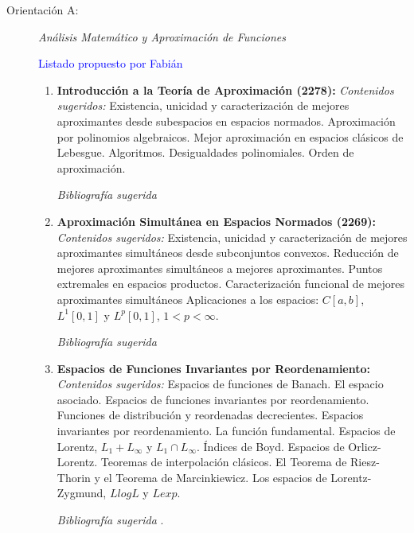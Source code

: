 \documentclass[a4paper, 12pt]{article}
\begin{document}
\begin{description}

\item[Orientación A:] \emph{Análisis Matemático y Aproximación de Funciones}

\textcolor{blue}{Listado propuesto por Fabián}


\begin{enumerate}


\item\textbf{Introducción a la Teoría de Aproximación (2278):}
\emph{Contenidos sugeridos:}
Existencia, unicidad y caracterización de mejores aproximantes desde subespacios en espacios normados. Aproximación por polinomios algebraicos.  Mejor aproximación en espacios clásicos de Lebesgue. Algoritmos. Desigualdades polinomiales. Orden de aproximación. 

\noindent \textit{Bibliografía sugerida}
\cite{cheney66,lorentz2005approximation,pinkus1989l1,iske2018approximation,powell1981approximation,rice1964approximation,singer1970best}



\item\textbf{ Aproximación Simultánea en Espacios Normados (2269):}
\emph{Contenidos sugeridos:} Existencia,  unicidad y caracterización de mejores aproximantes simultáneos desde subconjuntos
convexos.  Reducción  de  mejores aproximantes simultáneos a mejores aproximantes.   Puntos  extremales  en  espacios  productos. Caracterización  funcional de  mejores aproximantes  simultáneos  Aplicaciones  a  los espacios: $C[a,b]$, $L^1[0,1]$ y $L^p[0,1]$, $1 < p <\infty$.

\noindent \textit{Bibliografía sugerida} \cite{alimov,holland,Karakus,Lin,Pinkus,Houtari,Soriano}
 

 
\item\textbf{Espacios de Funciones Invariantes por Reordenamiento:}
\emph{Contenidos sugeridos:}  Espacios de funciones de Banach. El espacio asociado. Espacios de funciones invariantes por reordenamiento. Funciones de distribución y reordenadas decrecientes. Espacios invariantes por reordenamiento. La función fundamental.  Espacios de Lorentz, $L_1+ L_\infty$ y $L_1 \cap L_\infty$. Índices de Boyd. Espacios de Orlicz-Lorentz. Teoremas de interpolación clásicos. El Teorema de Riesz-Thorin y el Teorema de Marcinkiewicz. Los espacios de Lorentz-Zygmund, $LlogL$ y $Lexp$.

\noindent \textit{Bibliografía sugerida}
\cite{bennett1988interpolation,Soria,Lindenstrauss,Krein}.




\end{enumerate}
\end{description}
\end{document}
